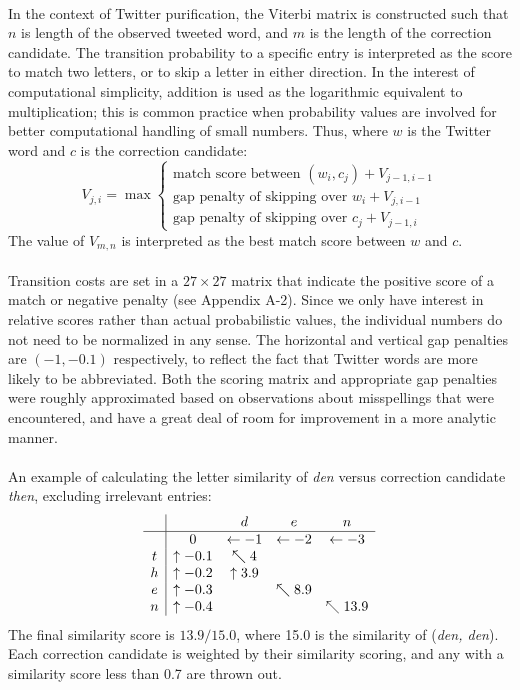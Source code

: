 \documentclass[twocolumn,10pt]{article}
\begin{document}
\paragraph{}In the context of Twitter purification, the Viterbi matrix is constructed such that $n$ is length of the observed tweeted word, and $m$ is the length of the correction candidate. The transition probability to a specific entry is interpreted as the score to match two letters, or to skip a letter in either direction. In the interest of computational simplicity, addition is used as the logarithmic equivalent to multiplication; this is common practice when probability values are involved for better computational handling of small numbers. Thus, where $w$ is the Twitter word and $c$ is the correction candidate:
$$V_{j,i} = \max\begin{cases}
\text{match score between $(w_i,c_j)$} + V_{j-1, i-1}\\
\text{gap penalty of skipping over $w_i$} + V_{j, i-1}\\
\text{gap penalty of skipping over $c_j$} + V_{j-1, i}
\end{cases}$$
The value of $V_{m,n}$ is interpreted as the best match score between $w$ and $c$.
\paragraph{} Transition costs are set in a $27 \times 27$ matrix that indicate the positive score of a match or negative penalty (see Appendix A-2). Since we only have interest in relative scores rather than actual probabilistic values, the individual numbers do not need to be normalized in any sense. The horizontal and vertical gap penalties are $(-1, -0.1)$ respectively, to reflect the fact that Twitter words are more likely to be abbreviated. Both the scoring matrix and appropriate gap penalties were roughly approximated based on observations about misspellings that were encountered, and have a great deal of room for improvement in a more analytic manner.
\paragraph{} An example of calculating the letter similarity of \textit{den} versus correction candidate \textit{then}, excluding irrelevant entries:
$$\begin{array} {c|cccc}
& & d & e & n \\ \hline
& 0 &\leftarrow -1 & \leftarrow -2 &  \leftarrow -3\\
t & \uparrow -0.1 & \nwarrow 4 & & \\
h & \uparrow -0.2 & \uparrow 3.9 & & \\
e & \uparrow -0.3& & \nwarrow 8.9 & \\
n & \uparrow -0.4 & & & \nwarrow 13.9 \\
\end{array}$$
The final similarity score is $13.9 / 15.0$, where 15.0 is the similarity of (\textit{den, den}). Each correction candidate is weighted by their similarity scoring, and any with a similarity score less than 0.7 are thrown out. 
\end{document}
